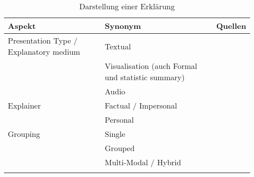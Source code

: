 \begin{longtable}{|p{}|p{}|p{}|}
    \hline
    \textbf{Aspekt}     & \textbf{Synonym} & \textbf{Quellen} \\ \hline
    Presentation Type / Explanatory medium
                        & Textual  & \cite{sokol_explainability_2020} \cite{balog_measuring_2020} \cite{tintarev_designing_nodate} \cite{sato_action-triggering_2019} \cite{eiband_impact_2019} \cite{eiband_impact_2019} \cite{abdulrahman_belief-based_2019} \cite{cassens_ambient_2019} \cite{nunes_systematic_2017} \\
                        & Visualisation (auch Formal und statistic summary) & \cite{sokol_explainability_2020} \cite{sato_action-triggering_2019} \cite{sokol_explainability_2020}  \cite{mucha_interfaces_2021} \cite{abdulrahman_belief-based_2019} \cite{nunes_systematic_2017} \cite{schrills_color_2020} \\
                       
                        & Audio & \cite{wiegand2019drive} \cite{nunes_systematic_2017} \cite{wang_is_2018} \\
    \hline
    Explainer           & Factual / Impersonal & \cite{eiband_impact_2019} \cite{abdulrahman_belief-based_2019} \cite{kunkel_let_2019} \cite{neerincx_using_2018} \\
                        & Personal & \cite{abdulrahman_belief-based_2019} \cite{kunkel_let_2019} \cite{weitz_you_2019} \cite{zahedi_towards_2019} \cite{neerincx_using_2018} \\
    \hline
    Grouping            & Single & \cite{nunes_systematic_2017} \cite{balog_measuring_2020} \cite{sato_action-triggering_2019} \cite{eiband_impact_2019} \cite{abdulrahman_belief-based_2019} \\
                        & Grouped & \cite{nunes_systematic_2017} \cite{balog_measuring_2020} \cite{tintarev_designing_nodate}  \\
                        & Multi-Modal / Hybrid & \cite{sato_action-triggering_2019} \cite{abdulrahman_belief-based_2019} \cite{cassens_ambient_2019} \\
    \hline
\caption{Darstellung einer Erklärung}
\label{tab:presentation_of_explanations}
\end{longtable}